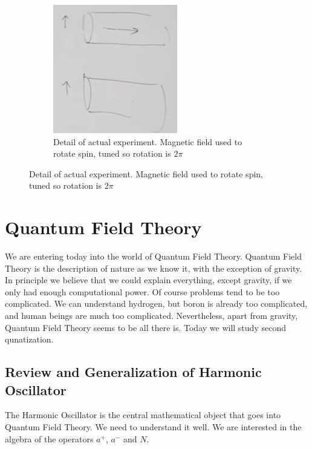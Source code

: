 \documentclass[]{article}
\begin{document}
\begin{figure}[H]
\begin{subfigure}[t]{0.3\textwidth}
	\end{subfigure}
	\begin{subfigure}[t]{0.3\textwidth}
		\caption{Detail of actual experiment. Magnetic field used to rotate spin, tuned so rotation is $2\pi$}
		\includegraphics[width=\textwidth]{aqm-5-expt-actual}
	\end{subfigure}
\end{figure}



\section{Quantum Field Theory}

We are entering today into the world of Quantum Field Theory. Quantum Field Theory is the description of nature as we know it, with the exception of gravity. In principle we believe that we could explain everything, except gravity, if we only had enough computational power. Of course problems tend to be too complicated. We can understand hydrogen, but boron is already too complicated, and human beings are much too complicated. Nevertheless, apart from gravity, Quantum Field Theory seems to be all there is. Today we will study second qunatization.

\subsection{Review and Generalization of Harmonic Oscillator}
The Harmonic Oscillator is the central mathematical object that goes into Quantum Field Theory. We need to understand it well.
We are interested in the algebra of the operators $a^+$, $a^-$ and $N$.
\end{document}
